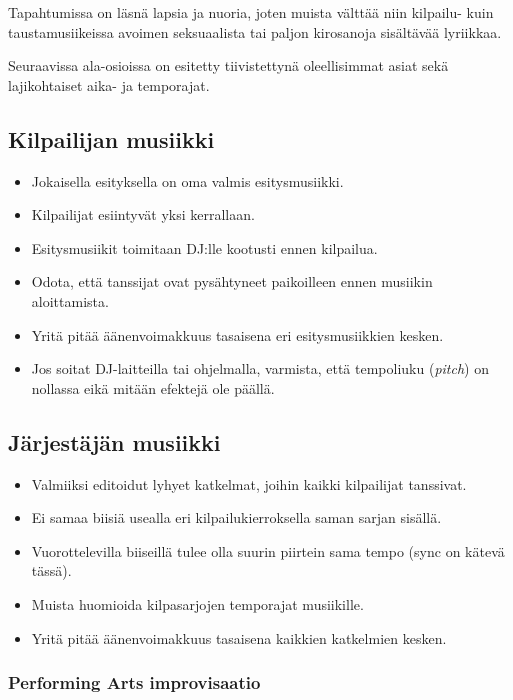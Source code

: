 \documentclass[12pt, a4paper, oneside]{article}
\begin{document}
Tapahtumissa on läsnä lapsia ja nuoria,
joten muista välttää niin kilpailu- kuin taustamusiikeissa avoimen seksuaalista tai paljon kirosanoja sisältävää lyriikkaa.

Seuraavissa ala-osioissa on esitetty tiivistettynä oleellisimmat asiat sekä lajikohtaiset aika- ja temporajat.

\subsection{Kilpailijan musiikki} \label{subsec:kilpailijan-musiikki}

\begin{itemize}[itemsep=-2pt]
    \item Jokaisella esityksella on oma valmis esitysmusiikki.
    \item Kilpailijat esiintyvät yksi kerrallaan.
    \item Esitysmusiikit toimitaan DJ:lle kootusti ennen kilpailua.
    \item Odota, että tanssijat ovat pysähtyneet paikoilleen ennen musiikin aloittamista.
    \item Yritä pitää äänenvoimakkuus tasaisena eri esitysmusiikkien kesken.
    \item Jos soitat DJ-laitteilla tai ohjelmalla, varmista, että tempoliuku (\textit{pitch}) on nollassa eikä mitään efektejä ole päällä.
\end{itemize}

\subsection{Järjestäjän musiikki} \label{subsec:jarjestajan-musiikki}

\begin{itemize}[itemsep=-2pt]
    \item Valmiiksi editoidut lyhyet katkelmat, joihin kaikki kilpailijat tanssivat.
    \item Ei samaa biisiä usealla eri kilpailukierroksella saman sarjan sisällä.
    \item Vuorottelevilla biiseillä tulee olla suurin piirtein sama tempo (sync on kätevä tässä).
    \item Muista huomioida kilpasarjojen temporajat musiikille.
    \item Yritä pitää äänenvoimakkuus tasaisena kaikkien katkelmien kesken.
\end{itemize}

\subsubsection{Performing Arts improvisaatio}
\end{document}
